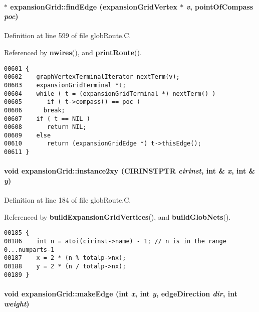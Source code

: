 \paragraph{ $\ast$ expansion\-Grid::find\-Edge ({\bf expansion\-Grid\-Vertex} $\ast$ {\em v}, {\bf point\-Of\-Compass} {\em poc})}\hfill



Definition at line 599 of file glob\-Route.C.

Referenced by {\bf nwires}(), and {\bf print\-Route}().\small\begin{verbatim}00601 {
00602    graphVertexTerminalIterator nextTerm(v);
00603    expansionGridTerminal *t;
00604    while ( t = (expansionGridTerminal *) nextTerm() )
00605       if ( t->compass() == poc )
00606      break;
00607    if ( t == NIL )
00608       return NIL;
00609    else
00610       return (expansionGridEdge *) t->thisEdge();
00611 }
\end{verbatim}\normalsize 
\label{expansionGrid_a3}
\paragraph{\setlength{\rightskip}{0pt plus 5cm}void expansion\-Grid::instance2xy (CIRINSTPTR {\em cirinst}, int \& {\em x}, int \& {\em y})}\hfill



Definition at line 184 of file glob\-Route.C.

Referenced by {\bf build\-Expansion\-Grid\-Vertices}(), and {\bf build\-Glob\-Nets}().\small\begin{verbatim}00185 {
00186    int n = atoi(cirinst->name) - 1; // n is in the range 0...numparts-1
00187    x = 2 * (n % totalp->nx);
00188    y = 2 * (n / totalp->nx);
00189 }
\end{verbatim}\normalsize 
\label{expansionGrid_c3}
\paragraph{\setlength{\rightskip}{0pt plus 5cm}void expansion\-Grid::make\-Edge (int {\em x}, int {\em y}, {\bf edge\-Direction} {\em dir}, int {\em weight})\hspace{0.3cm}{\tt  [private]}}\hfill



